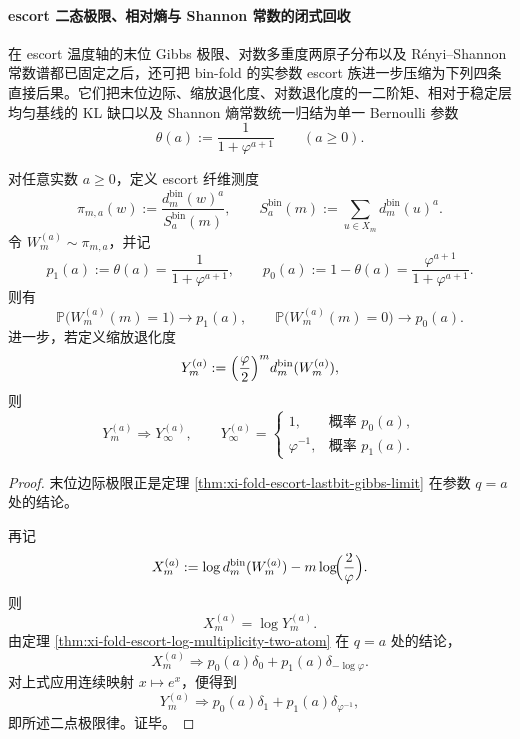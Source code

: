 \paragraph{escort 二态极限、相对熵与 Shannon 常数的闭式回收}
在 escort 温度轴的末位 Gibbs 极限、对数多重度两原子分布以及 Rényi--Shannon 常数谱都已固定之后，还可把 bin-fold 的实参数 escort 族进一步压缩为下列四条直接后果。它们把末位边际、缩放退化度、对数退化度的一二阶矩、相对于稳定层均匀基线的 KL 缺口以及 Shannon 熵常数统一归结为单一 Bernoulli 参数
\[
\theta(a):=\frac{1}{1+\varphi^{a+1}}
\qquad (a\ge 0).
\]

\begin{theorem}\label{thm:xi-time-part54ab-escort-two-state-limit-law}
对任意实数 \(a\ge 0\)，定义 escort 纤维测度
\[
\pi_{m,a}(w):=\frac{d_m^{\mathrm{bin}}(w)^a}{S_a^{\mathrm{bin}}(m)},
\qquad
S_a^{\mathrm{bin}}(m):=\sum_{u\in X_m}d_m^{\mathrm{bin}}(u)^a.
\]
令 \(W_m^{(a)}\sim \pi_{m,a}\)，并记
\[
p_1(a):=\theta(a)=\frac{1}{1+\varphi^{a+1}},
\qquad
p_0(a):=1-\theta(a)=\frac{\varphi^{a+1}}{1+\varphi^{a+1}}.
\]
则有
\[
\mathbb P\bigl(W_m^{(a)}(m)=1\bigr)\longrightarrow p_1(a),
\qquad
\mathbb P\bigl(W_m^{(a)}(m)=0\bigr)\longrightarrow p_0(a).
\]
进一步，若定义缩放退化度
\[
Y_m^{(a)}:=\Bigl(\frac{\varphi}{2}\Bigr)^m d_m^{\mathrm{bin}}(W_m^{(a)}),
\]
则
\[
Y_m^{(a)}\Longrightarrow Y_\infty^{(a)},
\qquad
Y_\infty^{(a)}=
\begin{cases}
1,& \text{概率 }p_0(a),\\[4pt]
\varphi^{-1},& \text{概率 }p_1(a).
\end{cases}
\]
\end{theorem}
\begin{proof}
末位边际极限正是定理 \ref{thm:xi-fold-escort-lastbit-gibbs-limit} 在参数 \(q=a\) 处的结论。

再记
\[
X_m^{(a)}:=\log d_m^{\mathrm{bin}}(W_m^{(a)})-m\log\!\Bigl(\frac{2}{\varphi}\Bigr).
\]
则
\[
X_m^{(a)}=\log Y_m^{(a)}.
\]
由定理 \ref{thm:xi-fold-escort-log-multiplicity-two-atom} 在 \(q=a\) 处的结论，
\[
X_m^{(a)}\Longrightarrow
p_0(a)\delta_0+p_1(a)\delta_{-\log\varphi}.
\]
对上式应用连续映射 \(x\mapsto e^x\)，便得到
\[
Y_m^{(a)}\Longrightarrow
p_0(a)\delta_1+p_1(a)\delta_{\varphi^{-1}},
\]
即所述二点极限律。证毕。
\end{proof}

